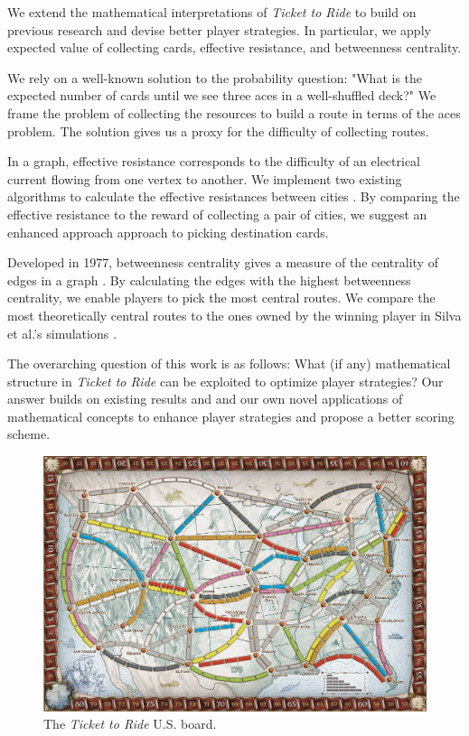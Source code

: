 We extend the mathematical interpretations of
\textit{Ticket to Ride} to build on previous research
and devise better player strategies.
In particular, we apply expected value of collecting cards,
effective resistance, and betweenness centrality.

We rely on a well-known solution to the probability question:
"What is the expected number of cards until
we see three aces in a well-shuffled deck?"
We frame the problem of collecting the resources
to build a route in terms of the aces problem.
The solution gives us a proxy for the difficulty
of collecting routes.

In a graph, effective resistance corresponds
to the difficulty of an electrical current flowing
from one vertex to another.
We implement two existing algorithms to calculate
the effective resistances between cities
\cite{ellens2011effective, wu2004theory}.
By comparing the effective resistance to the reward
of collecting a pair of cities, we suggest an enhanced approach 
approach to picking destination cards.

Developed in 1977, betweenness centrality gives a measure
of the centrality of edges in a graph
\cite{freeman1977set}.
By calculating the edges with the highest betweenness centrality,
we enable players to pick the most central routes.
We compare the most theoretically central routes
to the ones owned by the winning player in Silva et al.'s
simulations \cite{de2017playtesting}.

The overarching question of this work is as follows:
What (if any) mathematical structure in \textit{Ticket to Ride}
can be exploited to optimize player strategies?
Our answer builds on existing results and
and our own novel applications of mathematical concepts to enhance
player strategies and propose a better scoring scheme.

\begin{figure}[h]
\centering
\includegraphics[scale=.25]{figures/board}
\caption{The \textit{Ticket to Ride} U.S. board.}
\end{figure}

